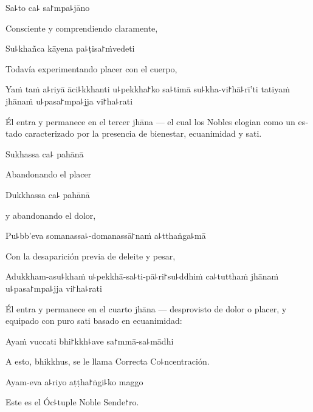 Sa꜕to ca꜕ sa꜓mpa꜕jāno

\begin{english}
	Consciente y comprendiendo claramente,
\end{english}

Su꜕khañca kāyena pa꜕ṭisa꜓ṁvedeti

\begin{english}
	Todavía experimentando placer con el cuerpo,
\end{english}

Yaṁ taṁ a꜕riyā āci꜕kkhanti u꜕pekkha꜓ko sa꜕timā su꜕kha-vi꜓hā꜕rī'ti tatiyaṁ jhānaṁ u꜕pasa꜓mpa꜕jja vi꜓ha꜕rati

\begin{english}
	Él entra y permanece en el tercer jhāna --- el cual los Nobles elogian como un estado caracterizado por la presencia de bienestar, ecuanimidad y sati.
\end{english}

Sukhassa ca꜕ pahānā

\begin{english}
	Abandonando el placer
\end{english}

Dukkhassa ca꜕ pahānā

\begin{english}
	y abandonando el dolor,
\end{english}

Pu꜕bb'eva somanassa꜕-domanassā꜓naṁ a꜕tthaṅga꜕mā

\begin{english}
	Con la desaparición previa de deleite y pesar,
\end{english}

Adukkham-asu꜕khaṁ u꜕pekkhā-sa꜕ti-pā꜕ri꜓su꜕ddhiṁ ca꜕tutthaṁ jhānaṁ u꜕pasa꜓mpa꜕jja vi꜓ha꜕rati

\begin{english}
	Él entra y permanece en el cuarto jhāna
	--- desprovisto de dolor o placer, y equipado con puro sati basado en ecuanimidad:
\end{english}

Ayaṁ vuccati bhi꜓kkh꜕ave sa꜓mmā-sa꜕mādhi

\begin{english}
	A esto, bhikkhus, se le llama Correcta Co꜕ncentración.
\end{english}

Ayam-eva a꜕riyo aṭṭha꜓ṅgi꜕ko maggo

\begin{english}
	Este es el Óc꜕tuple Noble Sende꜓ro.
\end{english}

